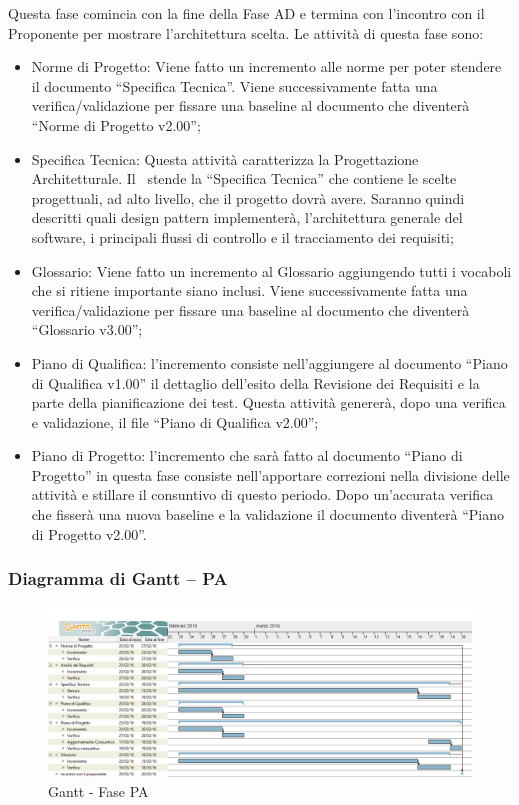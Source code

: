 \documentclass[../PianoProgetto.tex]{subfiles}
\begin{document}
		Questa fase comincia con la fine della Fase AD e termina con l’incontro con il Proponente per mostrare l’architettura scelta. Le attività di questa fase sono:
		\begin{itemize}
			\item Norme di Progetto: Viene fatto un incremento alle norme per poter stendere il documento “Specifica Tecnica”. Viene successivamente fatta una verifica/validazione per fissare una baseline al documento che diventerà “Norme di Progetto v2.00”;

			\item Specifica Tecnica: Questa attività caratterizza la Progettazione Architetturale. Il \progettista\ stende la “Specifica Tecnica” che contiene le scelte progettuali, ad alto livello, che il progetto dovrà avere. Saranno quindi descritti quali design pattern implementerà, l’architettura generale del software, i principali flussi di controllo e il tracciamento dei requisiti;

			\item Glossario: Viene fatto un incremento al Glossario aggiungendo tutti i vocaboli che si ritiene importante siano inclusi. Viene successivamente fatta una verifica/validazione per fissare una baseline al documento che diventerà “Glossario v3.00”;

 			\item Piano di Qualifica: l’incremento consiste nell’aggiungere al documento “Piano di Qualifica v1.00” il dettaglio dell’esito della Revisione dei Requisiti e la parte della pianificazione dei test. Questa attività genererà, dopo una verifica e validazione, il file “Piano di Qualifica v2.00”;

			\item Piano di Progetto: l’incremento che sarà fatto al documento “Piano di Progetto” in questa fase consiste nell’apportare correzioni nella divisione delle attività e stillare il consuntivo di questo periodo. Dopo un’accurata verifica che fisserà una nuova baseline e la validazione il documento diventerà “Piano di Progetto v2.00”.
		\end{itemize}
		
		\subsubsection{Diagramma di Gantt – PA}
			\begin{figure}[!h]
				\centering
				\includegraphics[width=\textwidth]{gantt_png/3-progettazione_architetturale}
				\caption{Gantt - Fase PA}
				\label{fig:Gantt - Fase PA}
			\end{figure}
						
\end{document}
